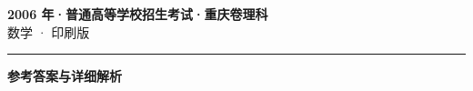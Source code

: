 \documentclass[zihao=5, a4paper]{ctexart}
\begin{document}
\begin{center}
  {\Large\bfseries 2006 年·普通高等学校招生考试·重庆卷理科}\\[4pt]
  {\large 数学 · 印刷版}
\end{center}
\medskip
{}

\par\bigskip\hrule\bigskip
{}
\begin{center}{\large\bfseries 参考答案与详细解析}\end{center}
\smallskip

\end{document}
